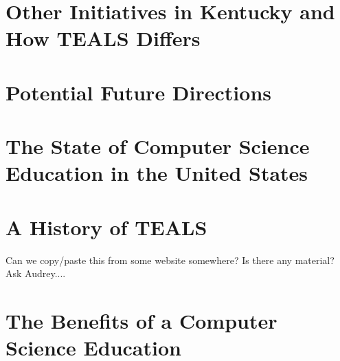 \documentclass[11pt]{article}
\begin{document}



%
\section{Other Initiatives in Kentucky and How TEALS Differs}\label{sec:diffs}


%
\section{Potential Future Directions}\label{sec:future}
%
%
%
%

\appendix

\section{The State of Computer Science Education in the United States}\label{sec:CSInUSA}

\section{A History of TEALS}\label{sec:TEALS}

Can we copy/paste this from some website somewhere? Is there any material? Ask Audrey....

\section{The Benefits of a Computer Science Education}\label{sec:benefits}

\printbibliography
\end{document}
